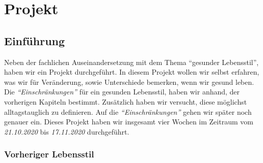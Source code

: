\chapter{Projekt}

\section{Einführung}
Neben der fachlichen Auseinandersetzung mit dem Thema “gesunder Lebensstil”, haben wir ein Projekt durchgeführt.
\newline
In diesem Projekt wollen wir selbst erfahren, was wir für Veränderung, sowie Unterschiede bemerken, wenn wir gesund leben.
\newline
Die \textit{“Einschränkungen”} für ein gesunden Lebensstil, haben wir anhand, der vorherigen Kapiteln bestimmt. Zusätzlich haben wir versucht, diese möglichst alltagstauglich zu definieren. Auf die \textit{“Einschränkungen”} gehen wir später noch genauer ein.
\newline
Dieses Projekt haben wir insgesamt vier Wochen im Zeitraum vom \textit{21.10.2020} bis \textit{17.11.2020} durchgeführt.
\subsection{Vorheriger Lebensstil}
